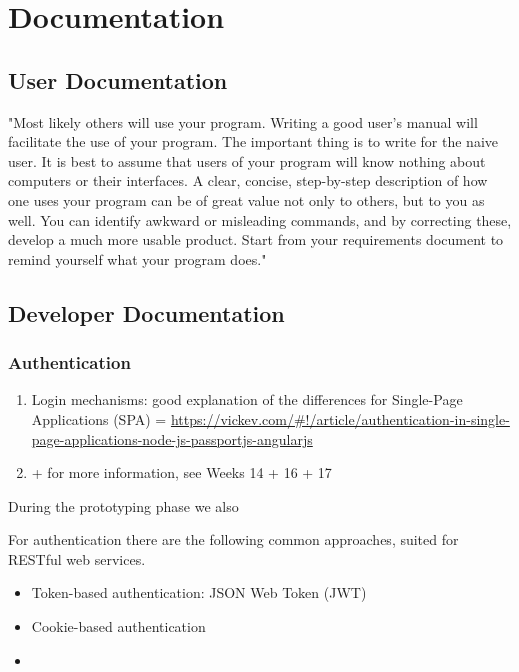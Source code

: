 \section{Documentation}

\subsection{User Documentation}

"Most likely others will use your program. Writing a good user's manual will facilitate the use of your program. The important thing is to write for the naive user. It is best to assume that users of your program will know nothing about computers or their interfaces. A clear, concise, step-by-step description of how one uses your program can be of great value not only to others, but to you as well. You can identify awkward or misleading commands, and by correcting these, develop a much more usable product. Start from your requirements document to remind yourself what your program does."

\subsection{Developer Documentation}

\subsubsection{Authentication}

\begin{enumerate}
\item Login mechanisms: good explanation of the differences for Single-Page Applications (SPA) = \url{https://vickev.com/#!/article/authentication-in-single-page-applications-node-js-passportjs-angularjs}
\item + for more information, see Weeks 14 + 16 + 17
\end{enumerate}


During the prototyping phase we also 

For authentication there are the following common approaches, suited for RESTful web services.

\begin{itemize}
\item Token-based authentication: JSON Web Token (JWT)
\item Cookie-based authentication
\item 
\end{itemize}



